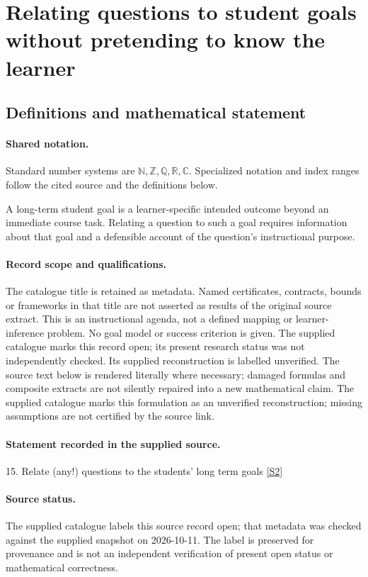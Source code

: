 \documentclass[11pt]{article}
\newcommand{\sref}[2]{\hyperlink{source:#1:#2}{[S#2]}}
\begin{document}
\section{Relating questions to student goals without pretending to know the learner}\label{statement}

\subsection{Definitions and mathematical statement}

\paragraph{Shared notation.}Standard number systems are $\mathbb N,\mathbb Z,\mathbb Q,\mathbb R,\mathbb C$. Specialized notation and index ranges follow the cited source and the definitions below.


A long-term student goal is a learner-specific intended outcome beyond an immediate course task. Relating a question to such a goal requires information about that goal and a defensible account of the question's instructional purpose.
\paragraph{Record scope and qualifications.}
The catalogue title is retained as metadata. Named certificates, contracts, bounds or frameworks in that title are not asserted as results of the original source extract.
This is an instructional agenda, not a defined mapping or learner-inference problem. No goal model or success criterion is given. The supplied catalogue marks this record open; its present research status was not independently checked. Its supplied reconstruction is labelled unverified.
The source text below is rendered literally where necessary; damaged formulas and composite extracts are not silently repaired into a new mathematical claim.
The supplied catalogue marks this formulation as an unverified reconstruction; missing assumptions are not certified by the source link.
\paragraph{Statement recorded in the supplied source.}
15. Relate (any!) questions to the students' long term goals \sref{statement}{2}
\paragraph{Source status.}
The supplied catalogue labels this source record open; that metadata was checked against the supplied snapshot on 2026-10-11. The label is preserved for provenance and is not an independent verification of present open status or mathematical correctness.
\end{document}
